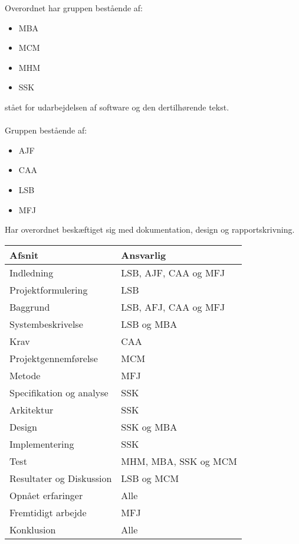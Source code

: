 Overordnet har gruppen bestående af:
\begin{itemize}
	\item MBA
	\item MCM
	\item MHM
	\item SSK
\end{itemize}
stået for udarbejdelsen af software og den dertilhørende tekst.\\ \\

Gruppen bestående af:
\begin{itemize}
	\item AJF
	\item CAA
	\item LSB
	\item MFJ
\end{itemize}
Har overordnet beskæftiget sig med dokumentation, design og rapportskrivning.

\begin{longtabu} to 
    Afsnit &    Ansvarlig\\[-1ex]
    \midrule
    Indledning & LSB, AJF, CAA og MFJ \\
    Projektformulering & LSB \\Baggrund & LSB, AFJ, CAA og MFJ \\
    Systembeskrivelse & LSB og MBA \\
    Krav & CAA \\
    Projektgennemførelse & MCM \\
    Metode & MFJ \\
    Specifikation og analyse & SSK \\
    Arkitektur & SSK \\
    Design & SSK og MBA \\
    Implementering & SSK \\
    Test & MHM, MBA, SSK og MCM \\
    Resultater og Diskussion & LSB og MCM \\
    Opnået erfaringer & Alle \\
    Fremtidigt arbejde & MFJ \\
    Konklusion & Alle \\    
    
    

\end{longtabu}